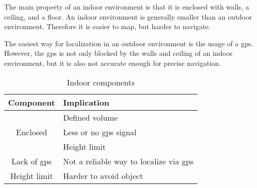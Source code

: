 The main property of an indoor environment is that it is enclosed with walls, a ceiling, and a floor. An indoor environment is generally smaller than an outdoor environment. Therefore it is easier to map, but harder to navigate.

The easiest way for localization in an outdoor environment is the usage of a \acs{gps}. However, the \acs{gps} is not only blocked by the walls and ceiling of an indoor environment, but it is also not accurate enough for precise navigation.

\begin{table}[!h]
  \centering
  \begin{tabular}{| c | l |}
    \hline
    \textbf{Component} & \textbf{Implication}\\
    \hline
    \multirow{3}{*}{Enclosed} & Defined volume\\
    & Less or no \acs{gps} signal\\
    & Height limit\\
    \hline
    Lack of \acs{gps} & Not a reliable way to localize via \acs{gps}\\
    \hline
    Height limit & Harder to avoid object\\
    \hline
  \end{tabular}
  \caption{Indoor components}
\end{table}